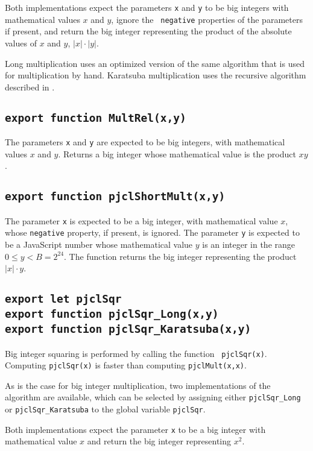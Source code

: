 \documentclass[12pt]{article}
\begin{document}
Both implementations expect the parameters {\tt x} and {\tt y} to be
big integers with mathematical values $x$ and $y$, ignore the {\tt
  negative} properties of the parameters if present, and return the big integer representing the
product of the absolute values of $x$ and $y$, $|x|\cdot|y|$.

Long multiplication uses an optimized version of the same algorithm
that is used for multiplication by hand.  Karatsuba multiplication
uses the recursive algorithm described in
\cite[\S~15.1.2]{gmp-manual}.

\subsection{\tt export function MultRel(x,y)}

The parameters {\tt x} and {\tt y} are expected to be big integers,
with mathematical values $x$ and $y$.  Returns a big integer whose
mathematical value is the product $xy$.

\subsection{\tt export function pjclShortMult(x,y)}

The parameter {\tt x} is expected to be a big integer, with
mathematical value $x$, whose {\tt negative} property, if present, is
ignored.  The parameter {\tt y} is expected to be a JavaScript number
whose mathematical value $y$ is an integer in the range $0 \leq y < B = 2^{24}$.  The
function returns the big integer representing the product $|x| \cdot y$.

\subsection{\tt export let pjclSqr\\export function pjclSqr\_Long(x,y)\\export function pjclSqr\_Karatsuba(x,y)}

Big integer squaring is performed by calling the function {\tt
  pjclSqr(x)}.  Computing {\tt pjclSqr(x)} is
faster than computing {\tt pjclMult(x,x)}.
  
As is the case for big integer multiplication, two
implementations of the algorithm are available, which can be selected
by assigning either {\tt pjclSqr\_Long} or {\tt pjclSqr\_Karatsuba} to
the global variable {\tt pjclSqr}.  

Both implementations expect the parameter {\tt x} to be a
big integer with mathematical value $x$ and return the big integer representing $x^2$.
\end{document}
